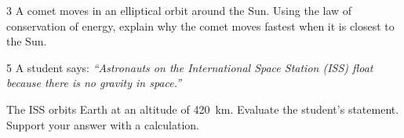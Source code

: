 \documentclass[12pt]{article}
\begin{document}
\Needspace{92mm}
\begin{saq}{3}
A comet moves in an elliptical orbit around the Sun. Using the law of conservation of energy,
explain why the comet moves fastest when it is closest to the Sun.
\end{saq}

\Needspace{142mm}
\begin{saq}{5}
A student says: \emph{\textquotedblleft Astronauts on the International Space Station (ISS) float
because there is no gravity in space.\textquotedblright}

The ISS orbits Earth at an altitude of \qty{420}{km}. Evaluate the student's statement. Support your
answer with a calculation.
\end{saq}
\end{document}

